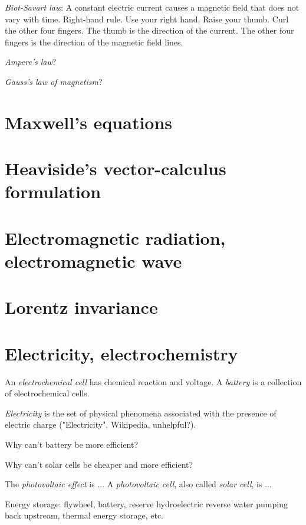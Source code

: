 \emph{Biot-Savart law}:
A constant electric current causes a magnetic field that does not vary with time.
Right-hand rule.
Use your right hand.
Raise your thumb.
Curl the other four fingers.
The thumb is the direction of the current.
The other four fingers is the direction of the magnetic field lines.

\emph{Ampere's law}?

\emph{Gauss's law of magnetism}?

\section{Maxwell's equations}

\section{Heaviside's vector-calculus formulation}

\section{Electromagnetic radiation, electromagnetic wave}

\section{Lorentz invariance}

\section{Electricity, electrochemistry}

An \emph{electrochemical cell} has chemical reaction and voltage.
A \emph{battery} is a collection of electrochemical cells.

\emph{Electricity} is the set of physical phenomena associated with the presence of electric charge ("Electricity", Wikipedia, unhelpful?).

Why can't battery be more efficient?

Why can't solar cells be cheaper and more efficient?

The \emph{photovoltaic effect} is ...
A \emph{photovoltaic cell}, also called \emph{solar cell}, is ...

Energy storage: flywheel, battery, reserve hydroelectric reverse water pumping back upstream, thermal energy storage, etc.

